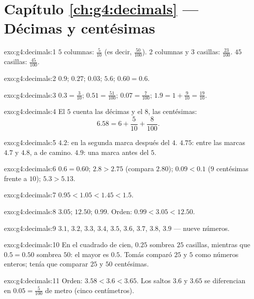 \section*{Capítulo \ref{ch:g4:decimals} --- Décimas y centésimas}

\begin{solution}{exo:g4:decimals:1}
$5$ columnas: $\frac{5}{10}$ (es decir, $\frac{50}{100}$). $2$ columnas
y $3$ casillas: $\frac{23}{100}$. $45$ casillas: $\frac{45}{100}$.
\end{solution}

\begin{solution}{exo:g4:decimals:2}
$0.9$; \quad $0.27$; \quad $0.03$; \quad $5.6$; \quad
$0.60 = 0.6$.
\end{solution}

\begin{solution}{exo:g4:decimals:3}
$0.3 = \frac{3}{10}$; \quad $0.51 = \frac{51}{100}$; \quad
$0.07 = \frac{7}{100}$; \quad $1.9 = 1 + \frac{9}{10} =
\frac{19}{10}$.
\end{solution}

\begin{solution}{exo:g4:decimals:4}
El $5$ cuenta las décimas y el $8$, las centésimas:
\[
6.58 = 6 + \frac{5}{10} + \frac{8}{100}.
\]
\end{solution}

\begin{solution}{exo:g4:decimals:5}
$4.2$: en la segunda marca después del $4$. $4.75$: entre las marcas
$4.7$ y $4.8$, a  de camino. $4.9$: una marca antes del $5$.
\end{solution}

\begin{solution}{exo:g4:decimals:6}
$0.6 = 0.60$; \quad $2.8 > 2.75$ (compara $2.80$); \quad
$0.09 < 0.1$ ($9$ centésimas frente a $10$); \quad
$5.3 > 5.13$.
\end{solution}

\begin{solution}{exo:g4:decimals:7}
$0.95 < 1.05 < 1.45 < 1.5$.
\end{solution}

\begin{solution}{exo:g4:decimals:8}
$3.05$; \quad $12.50$; \quad $0.99$. Orden:
$0.99 < 3.05 < 12.50$.
\end{solution}

\begin{solution}{exo:g4:decimals:9}
$3.1$, $3.2$, $3.3$, $3.4$, $3.5$, $3.6$, $3.7$, $3.8$, $3.9$ ---
nueve números.
\end{solution}

\begin{solution}{exo:g4:decimals:10}
En el cuadrado de cien, $0.25$ sombrea $25$ casillas, mientras que $0.5 = 0.50$
sombrea $50$: el mayor es $0.5$. Tomás comparó $25$ y
$5$ como números enteros; tenía que comparar $25$ y $50$ centésimas.
\end{solution}

\begin{solution}{exo:g4:decimals:11}
Orden: $3.58 < 3.6 < 3.65$. Los saltos $3.6$ y $3.65$ se diferencian en
$0.05 = \frac{5}{100}$ de metro (cinco centímetros).
\end{solution}
